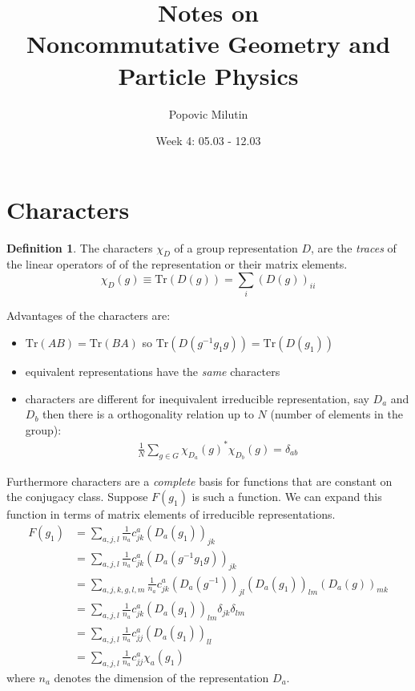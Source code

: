 \documentclass[a4paper]{article}
\title{Notes on \\ Noncommutative Geometry and Particle Physics}
\author{Popovic Milutin}
\date{Week 4: 05.03 - 12.03}
\theoremstyle{definition}
\newtheorem{definition}{Definition}
\theoremstyle{definition}
\theoremstyle{definition}
\theoremstyle{theorem}
\theoremstyle{theorem}
\theoremstyle{definition}
\begin{document}
\maketitle
\tableofcontents

\section{Characters}
\begin{definition}
    The characters $\chi _D$ of a group representation $D$, are the \textit{traces} of the linear operators
    of of the representation or their matrix elements.
    \begin{equation}
        \chi _D (g) \equiv \text{Tr}(D(g)) = \sum _i (D(g))_{ii}
    \end{equation}
\end{definition}
Advantages of the characters are:
\begin{itemize}
    \item $\text{Tr}(AB) = \text{Tr}(BA)$ so $\text{Tr}(D(g^{-1}g_1g)) = \text{Tr}(D(g_1))$
    \item equivalent representations have the \textit{same} characters
    \item characters are different for inequivalent irreducible representation,
        say $D_a$ and $D_b$ then there is a orthogonality relation up to $N$
        (number of elements in the group):
        \begin{align*}
            \frac{1}{N} \sum _{g\in G} \chi _{D_a}(g)^*\chi_{D_b}(g) = \delta _{ab}
        \end{align*}
\end{itemize}
Furthermore characters are a \textit{complete} basis for functions that are constant on the conjugacy
    class. Suppose $F(g_1)$ is such a function. We can expand this function in terms of matrix elements
    of irreducible representations.
    \begin{align*}
        F(g_1) &= \sum_{a,j,l}\frac{1}{n_a} c_{jk}^{a} (D_a(g_1))_{jk}  \\
                &= \sum_{a,j,l}\frac{1}{n_a} c_{jk}^{a} (D_a(g^{-1}g_1g))_{jk}  \\
                &= \sum_{a,j,k,g,l,m}\frac{1}{n_a} c_{jk}^{a} (D_a(g^{-1}))_{jl}(D_a(g_1))_{lm}(D_a(g))_{mk} \\
                &= \sum_{a,j,l}\frac{1}{n_a} c_{jk}^{a} (D_a(g_1))_{lm} \delta _{jk} \delta _{lm} \\
                &= \sum_{a,j,l}\frac{1}{n_a} c_{jj}^{a} (D_a(g_1))_{ll}  \\
                &= \sum_{a,j,l}\frac{1}{n_a} c_{jj}^{a} \chi _a (g_1)
    \end{align*}
where $n_a$ denotes the dimension of the representation $D_a$.
\newline
\end{document}
